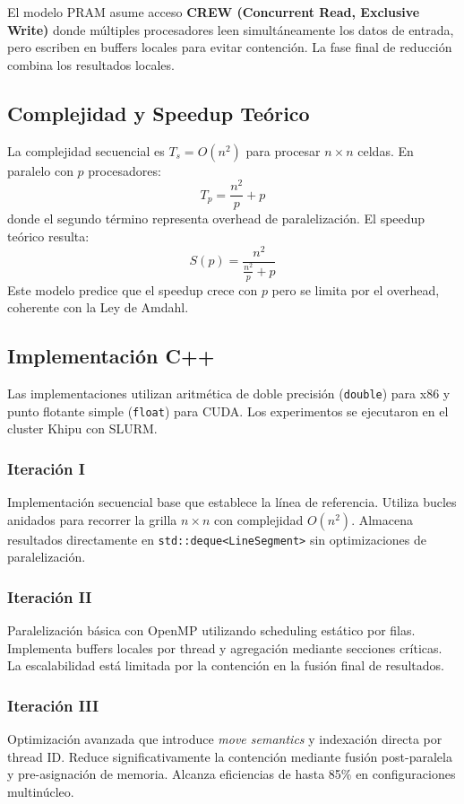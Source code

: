 \documentclass[12pt, A4]{article}
\begin{document}
El modelo PRAM asume acceso \textbf{CREW (Concurrent Read, Exclusive Write)} donde múltiples procesadores leen simultáneamente los datos de entrada, pero escriben en buffers locales para evitar contención. La fase final de reducción combina los resultados locales.

\subsection{Complejidad y Speedup Teórico}

La complejidad secuencial es $T_s = O(n^2)$ para procesar $n \times n$ celdas. En paralelo con $p$ procesadores:
\[
T_p = \frac{n^2}{p} + p
\]
donde el segundo término representa overhead de paralelización. El speedup teórico resulta:
\[
S(p) = \frac{n^2}{\frac{n^2}{p} + p}
\]
Este modelo predice que el speedup crece con $p$ pero se limita por el overhead, coherente con la Ley de Amdahl.



\subsection{Implementación C++}
Las implementaciones utilizan aritmética de doble precisión (\texttt{double}) para x86 y punto flotante simple (\texttt{float}) para CUDA. Los experimentos se ejecutaron en el cluster Khipu con SLURM.

\subsubsection{Iteración I}
Implementación secuencial base que establece la línea de referencia. Utiliza bucles anidados para recorrer la grilla $n \times n$ con complejidad $O(n^2)$. Almacena resultados directamente en \texttt{std::deque<LineSegment>} sin optimizaciones de paralelización.

\subsubsection{Iteración II}
Paralelización básica con OpenMP utilizando scheduling estático por filas. Implementa buffers locales por thread y agregación mediante secciones críticas. La escalabilidad está limitada por la contención en la fusión final de resultados.

\subsubsection{Iteración III}
Optimización avanzada que introduce \textit{move semantics} y indexación directa por thread ID. Reduce significativamente la contención mediante fusión post-paralela y pre-asignación de memoria. Alcanza eficiencias de hasta 85\% en configuraciones multinúcleo.
\end{document}
